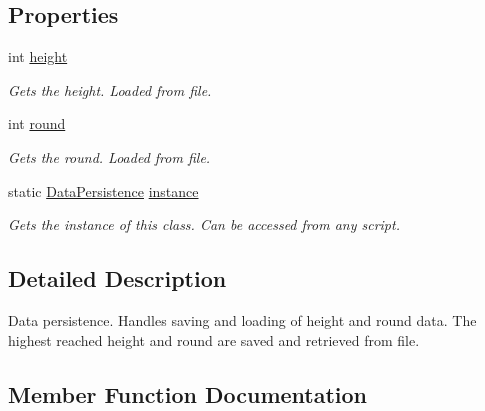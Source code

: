 \subsection*{Properties}
\begin{DoxyCompactItemize}
\item 
int \hyperlink{class_multi_stack_1_1_data_persistence_af7a5c84c3775aa714c16b32ffc052369}{height}
\begin{DoxyCompactList}\small\item\em Gets the height. Loaded from file. \end{DoxyCompactList}\item 
int \hyperlink{class_multi_stack_1_1_data_persistence_a964cbc11f47af6acf898c8e4d1e3c2fe}{round}
\begin{DoxyCompactList}\small\item\em Gets the round. Loaded from file. \end{DoxyCompactList}\item 
static \hyperlink{class_multi_stack_1_1_data_persistence}{Data\+Persistence} \hyperlink{class_multi_stack_1_1_data_persistence_aa35435eca48c1494a7b196403006da91}{instance}
\begin{DoxyCompactList}\small\item\em Gets the instance of this class. Can be accessed from any script. \end{DoxyCompactList}\end{DoxyCompactItemize}


\subsection{Detailed Description}
Data persistence. Handles saving and loading of height and round data. The highest reached height and round are saved and retrieved from file. 



\subsection{Member Function Documentation}
\hypertarget{class_multi_stack_1_1_data_persistence_a7c9f8ba349cd66a0bc6881fe2d1cc0f7}{}
